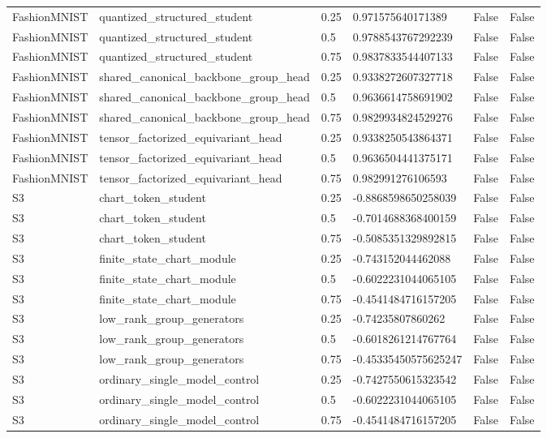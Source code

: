 \begin{table}[t]
\begin{tabular}{llllll}
FashionMNIST & quantized\_structured\_student & 0.25 & 0.971575640171389 & False & False \\
FashionMNIST & quantized\_structured\_student & 0.5 & 0.9788543767292239 & False & False \\
FashionMNIST & quantized\_structured\_student & 0.75 & 0.9837833544407133 & False & False \\
FashionMNIST & shared\_canonical\_backbone\_group\_head & 0.25 & 0.9338272607327718 & False & False \\
FashionMNIST & shared\_canonical\_backbone\_group\_head & 0.5 & 0.9636614758691902 & False & False \\
FashionMNIST & shared\_canonical\_backbone\_group\_head & 0.75 & 0.9829934824529276 & False & False \\
FashionMNIST & tensor\_factorized\_equivariant\_head & 0.25 & 0.9338250543864371 & False & False \\
FashionMNIST & tensor\_factorized\_equivariant\_head & 0.5 & 0.9636504441375171 & False & False \\
FashionMNIST & tensor\_factorized\_equivariant\_head & 0.75 & 0.982991276106593 & False & False \\
S3 & chart\_token\_student & 0.25 & -0.8868598650258039 & False & False \\
S3 & chart\_token\_student & 0.5 & -0.7014688368400159 & False & False \\
S3 & chart\_token\_student & 0.75 & -0.5085351329892815 & False & False \\
S3 & finite\_state\_chart\_module & 0.25 & -0.743152044462088 & False & False \\
S3 & finite\_state\_chart\_module & 0.5 & -0.6022231044065105 & False & False \\
S3 & finite\_state\_chart\_module & 0.75 & -0.4541484716157205 & False & False \\
S3 & low\_rank\_group\_generators & 0.25 & -0.74235807860262 & False & False \\
S3 & low\_rank\_group\_generators & 0.5 & -0.6018261214767764 & False & False \\
S3 & low\_rank\_group\_generators & 0.75 & -0.45335450575625247 & False & False \\
S3 & ordinary\_single\_model\_control & 0.25 & -0.7427550615323542 & False & False \\
S3 & ordinary\_single\_model\_control & 0.5 & -0.6022231044065105 & False & False \\
S3 & ordinary\_single\_model\_control & 0.75 & -0.4541484716157205 & False & False \\

\end{tabular}
\end{table}
